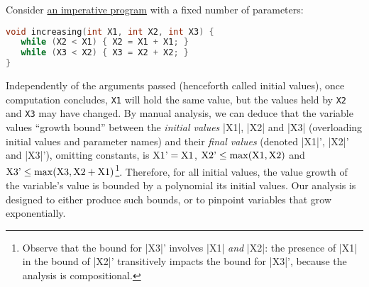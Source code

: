 \documentclass[runningheads]{llncs}
\begin{document}
\begin{example}\label{ex:increasing}
Consider \href{https://github.com/statycc/pymwp/blob/22f2ee159d86e83c3ee46ec62ecbc2b0a89d2d28/c_files/tool_paper/tool_ex_1.c}{an imperative program} with a fixed number of parameters: %
\begin{lstlisting}[language=C]
void increasing(int X1, int X2, int X3) {
   while (X2 < X1) { X2 = X1 + X1; }
   while (X3 < X2) { X3 = X2 + X2; }
}
\end{lstlisting}
Independently of the arguments passed (henceforth called initial values), once computation concludes, \texttt{X1} will hold the same value, but the values held by \texttt{X2} and \texttt{X3} may have changed.
By manual analysis, we can deduce that the variable values \enquote{growth bound} between the 
\emph{initial values} \prc|X1|, \prc|X2| and \prc|X3| (overloading initial values and parameter names) and their 
\emph{final values} (denoted  \prc|X1|', \prc|X2|' and \prc|X3|'), omitting constants, is
$\text{\prc|X1|'} = \text{\prc|X1|}$, 
$\text{\prc|X2|'} \leq \max(\text{\prc|X1|}, \text{\prc|X2|})$ and
$\text{\prc|X3|'} \leq \max(\text{\prc|X3|}, \text{\prc|X2|}+\text{\prc|X1|})$\footnote{%
	Observe that the bound for \prc|X3|' involves \prc|X1| \emph{and} \prc|X2|: the presence of \prc|X1| in the bound of \prc|X2|' transitively impacts the bound for \prc|X3|', because the analysis is compositional.}.
Therefore, for all initial values, the value growth of the variable's value is bounded by a polynomial \wrt its initial values.
Our analysis is designed to either produce such bounds, or to pinpoint variables that grow exponentially. %
\end{example}
%
%
%
%
%
\end{document}
